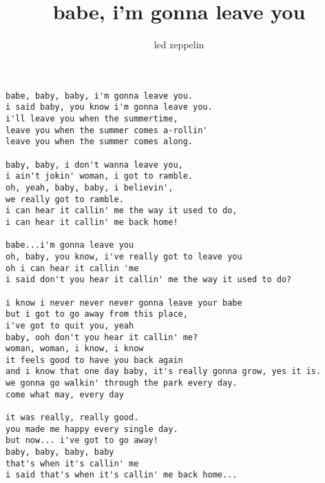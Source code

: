 \author{led zeppelin}
\title{babe, i'm gonna leave you}
\maketitle
\begin{verbatim}
babe, baby, baby, i'm gonna leave you. 
i said baby, you know i'm gonna leave you. 
i'll leave you when the summertime, 
leave you when the summer comes a-rollin' 
leave you when the summer comes along. 

baby, baby, i don't wanna leave you, 
i ain't jokin' woman, i got to ramble. 
oh, yeah, baby, baby, i believin', 
we really got to ramble. 
i can hear it callin' me the way it used to do, 
i can hear it callin' me back home! 

babe...i'm gonna leave you 
oh, baby, you know, i've really got to leave you 
oh i can hear it callin 'me 
i said don't you hear it callin' me the way it used to do? 

i know i never never never gonna leave your babe 
but i got to go away from this place, 
i've got to quit you, yeah 
baby, ooh don't you hear it callin' me? 
woman, woman, i know, i know 
it feels good to have you back again 
and i know that one day baby, it's really gonna grow, yes it is. 
we gonna go walkin' through the park every day. 
come what may, every day 

it was really, really good. 
you made me happy every single day. 
but now... i've got to go away! 
baby, baby, baby, baby 
that's when it's callin' me 
i said that's when it's callin' me back home... 
\end{verbatim}